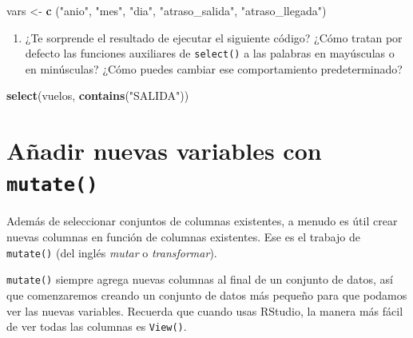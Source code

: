 \documentclass[11pt,oneside]{report}
\newenvironment{Shaded}{\begin{snugshade}}{\end{snugshade}}
\newcommand{\KeywordTok}[1]{\textcolor[rgb]{0.13,0.29,0.53}{\textbf{#1}}}
\newcommand{\NormalTok}[1]{#1}
\newcommand{\StringTok}[1]{\textcolor[rgb]{0.31,0.60,0.02}{#1}}
\providecommand{\tightlist}{%
  \setlength{\itemsep}{0pt}\setlength{\parskip}{0pt}}
\begin{document}
\begin{Shaded}
\begin{Highlighting}[]
\NormalTok{vars <-}\StringTok{ }\KeywordTok{c}\NormalTok{ (}\StringTok{"anio"}\NormalTok{, }\StringTok{"mes"}\NormalTok{, }\StringTok{"dia"}\NormalTok{, }\StringTok{"atraso_salida"}\NormalTok{, }\StringTok{"atraso_llegada"}\NormalTok{)}
\end{Highlighting}
\end{Shaded}

\begin{enumerate}
\def\labelenumi{\arabic{enumi}.}
\setcounter{enumi}{3}
\tightlist
\item
  ¿Te sorprende el resultado de ejecutar el siguiente código? ¿Cómo
  tratan por defecto las funciones auxiliares de \texttt{select()} a las
  palabras en mayúsculas o en minúsculas? ¿Cómo puedes cambiar ese
  comportamiento predeterminado?
\end{enumerate}

\begin{Shaded}
\begin{Highlighting}[]
\KeywordTok{select}\NormalTok{(vuelos, }\KeywordTok{contains}\NormalTok{(}\StringTok{"SALIDA"}\NormalTok{))}
\end{Highlighting}
\end{Shaded}

\hypertarget{auxf1adir-nuevas-variables-con-mutate}{%
\section{\texorpdfstring{Añadir nuevas variables con
\texttt{mutate()}}{Añadir nuevas variables con mutate()}}\label{auxf1adir-nuevas-variables-con-mutate}}

Además de seleccionar conjuntos de columnas existentes, a menudo es útil
crear nuevas columnas en función de columnas existentes. Ese es el
trabajo de \texttt{mutate()} (del inglés \emph{mutar} o
\emph{transformar}).

\texttt{mutate()} siempre agrega nuevas columnas al final de un conjunto
de datos, así que comenzaremos creando un conjunto de datos más pequeño
para que podamos ver las nuevas variables. Recuerda que cuando usas
RStudio, la manera más fácil de ver todas las columnas es
\texttt{View()}.
\end{document}
